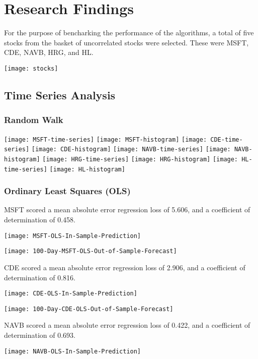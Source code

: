 \chapter{Research Findings}
For the purpose of bencharking the performance of the algorithms, a total of five stocks from the basket of uncorrelated stocks were selected. These were MSFT, CDE, NAVB, HRG, and HL. 

\texttt{[image: stocks]}

\section{Time Series Analysis}

\subsection{Random Walk}
\texttt{[image: MSFT-time-series]}
\texttt{[image: MSFT-histogram]}
\texttt{[image: CDE-time-series]}
\texttt{[image: CDE-histogram]}
\texttt{[image: NAVB-time-series]}
\texttt{[image: NAVB-histogram]}
\texttt{[image: HRG-time-series]}
\texttt{[image: HRG-histogram]}
\texttt{[image: HL-time-series]}
\texttt{[image: HL-histogram]}

\subsection{Ordinary Least Squares (OLS)}
MSFT scored a mean absolute error regression loss of 5.606, and a coefficient of determination of 0.458.

\texttt{[image: MSFT-OLS-In-Sample-Prediction]}

\texttt{[image: 100-Day-MSFT-OLS-Out-of-Sample-Forecast]}

CDE scored a mean absolute error regression loss of 2.906, and a coefficient of determination of 0.816.

\texttt{[image: CDE-OLS-In-Sample-Prediction]}

\texttt{[image: 100-Day-CDE-OLS-Out-of-Sample-Forecast]}

NAVB scored a mean absolute error regression loss of 0.422, and a coefficient of determination of 0.693.

\texttt{[image: NAVB-OLS-In-Sample-Prediction]}

